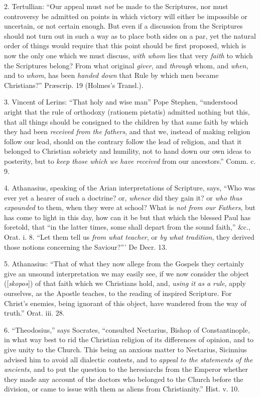 2. Tertullian: ``Our appeal must \emph{not} be made to the
Scriptures, nor must controversy be admitted on points in which
victory will either be impossible or uncertain, or not certain enough.
But even if a discussion from the Scriptures should not turn out in
such a way as to place both sides on a par, yet the natural order of
things would require that this point should be first proposed, which
is now the only one which we must discuss, \emph{with whom} lies that
very \emph{faith} to which the Scriptures belong? From what original \emph{giver},
and \emph{through} whom, and \emph{when}, and to \emph{whom}, has been
\emph{handed down} that Rule by which men became Christians?''
Præscrip. 19 (Holmes's Transl.).

3. Vincent of Lerins: ``That holy and wise man'' Pope
Stephen, ``understood aright that the rule of orthodoxy (rationem
pietatis) admitted nothing but this, that all things should be
consigned to the children by that same faith by which they had been \emph{received
from the fathers}, and that we, instead of making religion follow
our lead, should on the contrary follow the lead of religion, and that
it belonged to Christian sobriety and humility, not to hand down our
own ideas to posterity, but to \emph{keep those which we have received}
from our ancestors.'' Comm. c. 9.

4. Athanasius, speaking of the Arian interpretations of Scripture,
says, ``Who was ever yet a hearer of such a doctrine? or, \emph{whence}
did they gain it? or \emph{who thus expounded} to them, when they were
at school? What is \emph{not from our Fathers}, but has come to light
in this day, how can it be but that which the blessed Paul has
foretold, that ``in the latter times, some shall depart from the
sound faith,'' \&c., Orat. i. 8. ``Let them tell us \emph{from
what teacher}, or \emph{by what tradition}, they derived those
notions concerning the Saviour?''' De Decr. 13.

5. Athanasius: ``That of what they now allege from the Gospels
they certainly give an unsound interpretation we may easily see, if we
now consider the object ([\emph{skopos}]) of that faith which we
Christians hold, and, \emph{using it as a rule}, apply ourselves, as
the Apostle teaches, to the reading of inspired Scripture. For Christ's
enemies, being ignorant of this object, have wandered from the way of
truth.'' Orat. iii. 28.

6. ``Theodosius,'' says Socrates, ``consulted Nectarius,
Bishop of Constantinople, in what way best to rid the Christian
religion of its differences of opinion, and to give unity to the
Church. This being an anxious matter to Nectarius, Sicinnius advised
him to avoid all dialectic contests, and to \emph{appeal to the
statements of the ancients}, and to put the question to the
heresiarchs from the Emperor whether they made any account of the
doctors who belonged to the Church before the division, or came to
issue with them as aliens from Christianity.'' Hist. v. 10.

